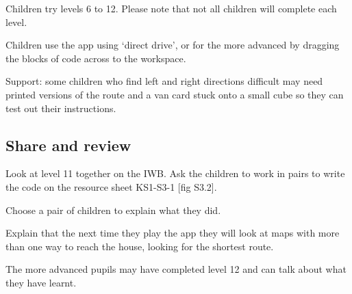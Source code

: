 \documentclass{../../../lessonplan}
\begin{document}
\begin{lessonplan}
Children try levels 6 to 12.
Please note that not all children will complete each level.

Children use the app using `direct drive', or for the more advanced by dragging the blocks of code across to the workspace.

Support: some children who find left and right directions difficult may need printed versions of the route and a van card stuck onto a small cube so they can test out their instructions.

\subsection*{Share and review}

Look at level 11 together on the IWB.
Ask the children to work in pairs to write the code on the resource sheet KS1-S3-1 [fig S3.2].


Choose a pair of children to explain what they did.

Explain that the next time they play the app they will look at maps with more than one way to reach the house, looking for the shortest route.

The more advanced pupils may have completed level 12 and can talk about what they have learnt.

\end{lessonplan}
\end{document}
